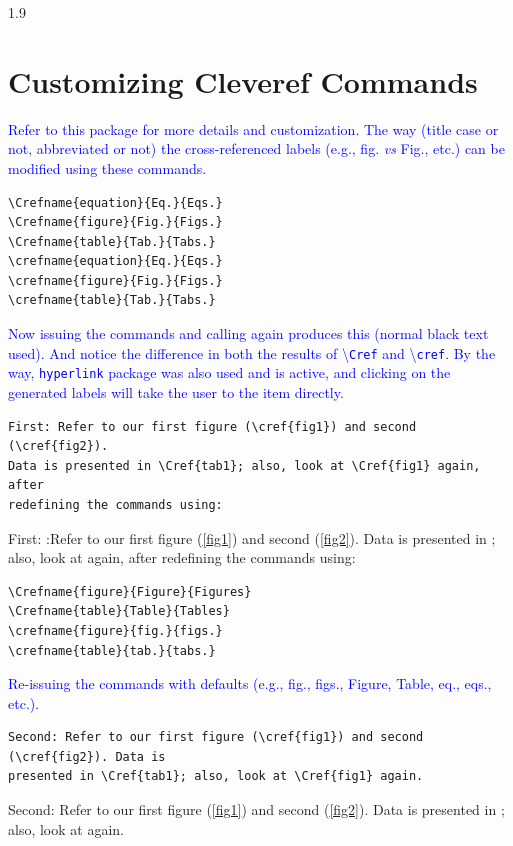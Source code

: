 \documentclass[phd]{ndsu-thesis-2022}
\newcommand\myspacing{1.9} %
\newcommand\italk[1]{\textcolor{blue}{#1}}  %
\newcommand\cmd[1]{\textbackslash\texttt{#1}}  %
\begin{document}
\begin{spacing}{\myspacing}
\section{Customizing Cleveref Commands}
\italk{Refer to this package for more details and customization. The way (title case or not, abbreviated or not) the cross-referenced labels (e.g., fig. \emph{vs} Fig., etc.) can be modified using these commands. 
}

\begin{verbatim}
\Crefname{equation}{Eq.}{Eqs.}
\Crefname{figure}{Fig.}{Figs.}
\Crefname{table}{Tab.}{Tabs.}
\crefname{equation}{Eq.}{Eqs.}
\crefname{figure}{Fig.}{Figs.}
\crefname{table}{Tab.}{Tabs.}
\end{verbatim}

\italk{Now issuing the commands and calling again produces this (normal black text used). And notice the difference in both the results of \cmd{Cref} and \cmd{cref}. By the way, \texttt{hyperlink} package was also used and is active, and clicking on the generated labels will take the user to the item directly. }


{\singlespacing
\begin{verbatim}
First: Refer to our first figure (\cref{fig1}) and second (\cref{fig2}). 
Data is presented in \Cref{tab1}; also, look at \Cref{fig1} again, after 
redefining the commands using:
\end{verbatim}
}
First: :Refer to our first figure (\cref{fig1}) and second (\cref{fig2}). Data is presented in ; also, look at  again, after redefining the commands using:

\begin{verbatim}
\Crefname{figure}{Figure}{Figures}
\Crefname{table}{Table}{Tables}
\crefname{figure}{fig.}{figs.}
\crefname{table}{tab.}{tabs.}
\end{verbatim}


\italk{Re-issuing the commands with defaults (e.g., fig., figs., Figure, Table, eq., eqs., etc.).}


{\singlespacing
\begin{verbatim}
Second: Refer to our first figure (\cref{fig1}) and second (\cref{fig2}). Data is 
presented in \Cref{tab1}; also, look at \Cref{fig1} again. 
\end{verbatim}
}
Second: Refer to our first figure (\cref{fig1}) and second (\cref{fig2}). Data is presented in ; also, look at  again. 


\end{spacing}
\end{document}
